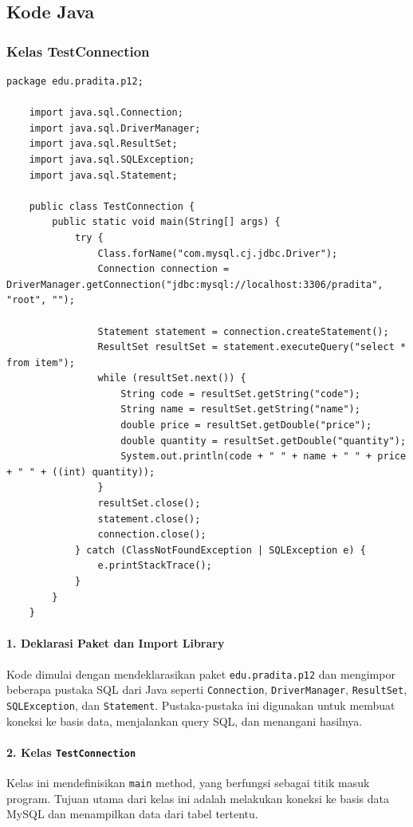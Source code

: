 \subsection{Kode Java}

\subsubsection{Kelas TestConnection}

\begin{lstlisting}[style=JavaStyle]
	package edu.pradita.p12;
	
	import java.sql.Connection;
	import java.sql.DriverManager;
	import java.sql.ResultSet;
	import java.sql.SQLException;
	import java.sql.Statement;
	
	public class TestConnection {
		public static void main(String[] args) {
			try {
				Class.forName("com.mysql.cj.jdbc.Driver");
				Connection connection = DriverManager.getConnection("jdbc:mysql://localhost:3306/pradita", "root", "");
				
				Statement statement = connection.createStatement();
				ResultSet resultSet = statement.executeQuery("select * from item");
				while (resultSet.next()) {
					String code = resultSet.getString("code");
					String name = resultSet.getString("name");
					double price = resultSet.getDouble("price");
					double quantity = resultSet.getDouble("quantity");
					System.out.println(code + " " + name + " " + price + " " + ((int) quantity));
				}
				resultSet.close();
				statement.close();
				connection.close();
			} catch (ClassNotFoundException | SQLException e) {
				e.printStackTrace();
			}
		}
	}
\end{lstlisting}

\paragraph{1. Deklarasi Paket dan Import Library}
Kode dimulai dengan mendeklarasikan paket \texttt{edu.pradita.p12} dan mengimpor beberapa pustaka SQL dari Java seperti \texttt{Connection}, \texttt{DriverManager}, \texttt{ResultSet}, \texttt{SQLException}, dan \texttt{Statement}. Pustaka-pustaka ini digunakan untuk membuat koneksi ke basis data, menjalankan query SQL, dan menangani hasilnya.

\paragraph{2. Kelas \texttt{TestConnection}}
Kelas ini mendefinisikan \texttt{main} method, yang berfungsi sebagai titik masuk program. Tujuan utama dari kelas ini adalah melakukan koneksi ke basis data MySQL dan menampilkan data dari tabel tertentu.

